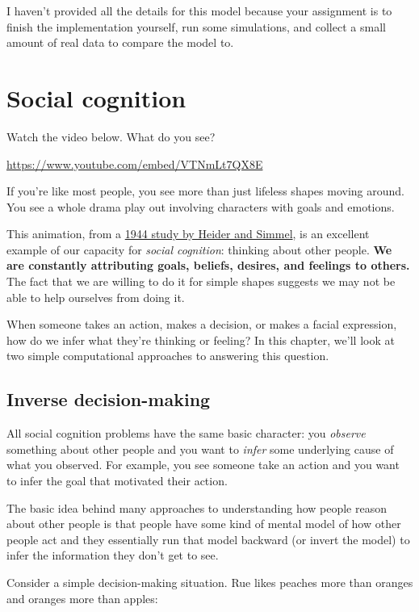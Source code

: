 \documentclass[
  letterpaper,
  DIV=11,
  numbers=noendperiod]{scrreprt}
\begin{document}
I haven't provided all the details for this model because your
assignment is to finish the implementation yourself, run some
simulations, and collect a small amount of real data to compare the
model to.


\chapter{Social cognition}\label{social-cognition}

Watch the video below. What do you see?

\url{https://www.youtube.com/embed/VTNmLt7QX8E}

If you're like most people, you see more than just lifeless shapes
moving around. You see a whole drama play out involving characters with
goals and emotions.

This animation, from a
\href{https://psycnet.apa.org/doi/10.2307/1416950}{1944 study by Heider
and Simmel}, is an excellent example of our capacity for \emph{social
cognition}: thinking about other people. \textbf{We are constantly
attributing goals, beliefs, desires, and feelings to others.} The fact
that we are willing to do it for simple shapes suggests we may not be
able to help ourselves from doing it.

When someone takes an action, makes a decision, or makes a facial
expression, how do we infer what they're thinking or feeling? In this
chapter, we'll look at two simple computational approaches to answering
this question.

\section{Inverse decision-making 🍑}\label{inverse-decision-making}

All social cognition problems have the same basic character: you
\emph{observe} something about other people and you want to \emph{infer}
some underlying cause of what you observed. For example, you see someone
take an action and you want to infer the goal that motivated their
action.

The basic idea behind many approaches to understanding how people reason
about other people is that people have some kind of mental model of how
other people act and they essentially run that model backward (or invert
the model) to infer the information they don't get to see.

Consider a simple decision-making situation. Rue likes peaches more than
oranges and oranges more than apples:
\end{document}
